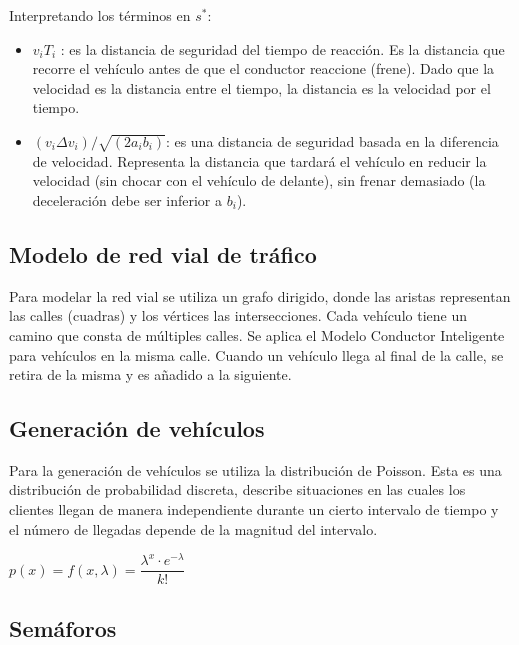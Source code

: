 \documentclass[twoside,twocolumn]{article} %
\begin{document}
	Interpretando los t\'erminos en $ s^{*} $:
	\begin{itemize}
		\item $ v_{i}T_{i}  $ : es la distancia de seguridad del tiempo de reacción. Es la distancia que recorre el vehículo antes de que el conductor reaccione (frene).
		Dado que la velocidad es la distancia entre el tiempo, la distancia es la velocidad por el tiempo.
		\item $ (v_{i} \Delta v_{i})/\sqrt{(2a_{i} b_{i})} $: es una distancia de seguridad basada en la diferencia de velocidad. Representa la distancia que tardará el vehículo en reducir la velocidad (sin chocar con el vehículo de delante), sin frenar demasiado (la deceleración debe ser inferior a $ b_{i} $).
	\end{itemize}
	
	\subsection{Modelo de red vial de tráfico}
	
	Para modelar la red vial se utiliza un grafo dirigido, donde las aristas representan las calles (cuadras) y los vértices las intersecciones. Cada vehículo tiene un camino que consta de múltiples calles. Se aplica el Modelo Conductor Inteligente para vehículos en la misma calle. Cuando un vehículo llega al final de la calle, se retira de la misma y es añadido a la siguiente.
	
	\subsection{Generación de vehículos}
	
	Para la generación de vehículos se utiliza la distribución de Poisson. Esta es una distribución de probabilidad discreta, describe situaciones en las cuales los clientes llegan de manera independiente durante un cierto intervalo de tiempo y el número de llegadas depende de la magnitud del intervalo.
	
 	\begin{center}
		$ p(x) = f(x, \lambda) = \dfrac{\lambda^{x} \cdot e^{-\lambda}}{k!} $		
 	\end{center}
 
	\subsection{Semáforos}
	
\end{document}
